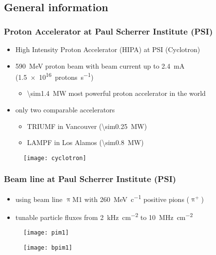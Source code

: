 \subsection{General information}
\begin{frame}
	\frametitle{Proton Accelerator at Paul Scherrer Institute (PSI)}
	\begin{itemize}
		\setlength{\itemsep}{\fill}
		\item High Intensity Proton Accelerator (HIPA) at PSI (Cyclotron)
		\item \SI{590}{\mega\electronvolt} proton beam with beam current up to \SI{2.4}{\milli\ampere} (\SI{1.5e16}{protons\per s})
		\begin{itemize}
			\vspace*{4pt}
			\item \SI{\sim1.4}{\mega\watt} \ra most powerful proton accelerator in the world
		\end{itemize}
		\vspace*{4pt}
		\item only two comparable accelerators
		\begin{itemize}
			\vspace*{4pt}
			\item TRIUMF in Vancouver (\SI{\sim0.25}{\mega\watt})
			\item LAMPF in Los Alamos (\SI{\sim0.8}{\mega\watt})
		\end{itemize}
	\end{itemize}
	\begin{figure}
		\centering
		\texttt{[image: cyclotron]}
	\end{figure}
\end{frame}
\begin{frame}
	\frametitle{Beam line at Paul Scherrer Institute (PSI)}
	\begin{minipage}[c][.75\textheight]{6.5cm}
		\begin{itemize}
			\setlength{\itemsep}{\fill}
			\item using beam line $\uppi$M1 with \SI{260}{\mega\electronvolt\per c} positive pions ($\uppi^+$)
			\item tunable particle fluxes from \SI{2}{\kilo\hertz\per cm^2} to \SI{10}{\mega\hertz\per cm^2}
		\end{itemize}
		\begin{figure}
			\centering
			\texttt{[image: pim1]}
		\end{figure}
	\end{minipage}
	\begin{minipage}{4.5cm}
		\begin{figure}
			\centering
			\texttt{[image: bpim1]}
		\end{figure}
	\end{minipage}
\end{frame}
